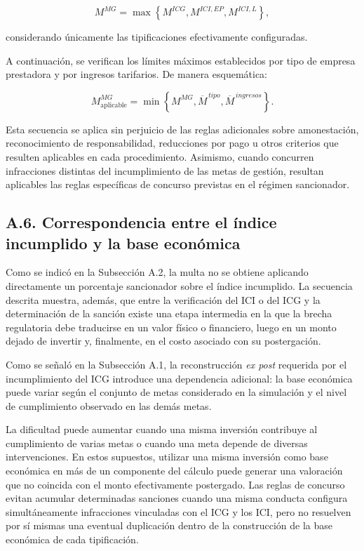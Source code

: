 \begin{equation}
\label{eq:anexo_concurso}
M^{MG}
=
\max
\left\{
M^{ICG},
M^{ICI,EP},
M^{ICI,L}
\right\},
\end{equation}

considerando únicamente las tipificaciones efectivamente configuradas.

A continuación, se verifican los límites máximos establecidos por tipo de empresa prestadora y por ingresos tarifarios. De manera esquemática:

\begin{equation}
\label{eq:anexo_multa_final}
M^{MG}_{\mathrm{aplicable}}
=
\min
\left\{
M^{MG},
\overline M^{\,tipo},
\overline M^{\,ingresos}
\right\}.
\end{equation}

Esta secuencia se aplica sin perjuicio de las reglas adicionales sobre amonestación, reconocimiento de responsabilidad, reducciones por pago u otros criterios que resulten aplicables en cada procedimiento. Asimismo, cuando concurren infracciones distintas del incumplimiento de las metas de gestión, resultan aplicables las reglas específicas de concurso previstas en el régimen sancionador.

\subsection*{A.6. Correspondencia entre el índice incumplido y la base económica}

Como se indicó en la Subsección A.2, la multa no se obtiene aplicando directamente un porcentaje sancionador sobre el índice incumplido. La secuencia descrita muestra, además, que entre la verificación del ICI o del ICG y la determinación de la sanción existe una etapa intermedia en la que la brecha regulatoria debe traducirse en un valor físico o financiero, luego en un monto dejado de invertir y, finalmente, en el costo asociado con su postergación.

Como se señaló en la Subsección A.1, la reconstrucción \textit{ex post} requerida por el incumplimiento del ICG introduce una dependencia adicional: la base económica puede variar según el conjunto de metas considerado en la simulación y el nivel de cumplimiento observado en las demás metas.

La dificultad puede aumentar cuando una misma inversión contribuye al cumplimiento de varias metas o cuando una meta depende de diversas intervenciones. En estos supuestos, utilizar una misma inversión como base económica en más de un componente del cálculo puede generar una valoración que no coincida con el monto efectivamente postergado. Las reglas de concurso evitan acumular determinadas sanciones cuando una misma conducta configura simultáneamente infracciones vinculadas con el ICG y los ICI, pero no resuelven por sí mismas una eventual duplicación dentro de la construcción de la base económica de cada tipificación.


